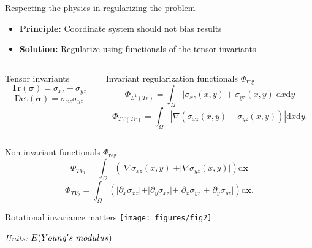 \documentclass[presentation,aspectratio=169]{beamer}
\newcommand{\dd}{\mathrm{d}}
\newcommand{\bx}{\mathbf{x}}
\begin{document}
 
\begin{frame}{Respecting the physics in regularizing the problem}
\small
\begin{itemize}
\item \textbf{Principle:} Coordinate system should not bias results
\item \textbf{Solution:}  Regularize using functionals of the tensor invariants
\end{itemize}
\begin{columns}
\begin{column}{0.35\textwidth}
\begin{block}{Tensor invariants}
\[
\textrm{Tr}(\boldsymbol\sigma) = \sigma_{xz} + \sigma_{yz}
\]
\[
\textrm{Det}(\boldsymbol\sigma) = \sigma_{xz}\sigma_{yz}
\]
\end{block}
\end{column}
\begin{column}{0.6\textwidth}
\begin{exampleblock}{Invariant regularization functionals $\Phi_{\textrm{reg}}$}
\[
\Phi_{L^1(Tr)} = \int_\Omega \vert \sigma_{xz}(x,y) + \sigma_{yz}(x,y)  \vert \dd x\dd y
\]
\[
\Phi_{TV(Tr)} =  \int_\Omega | \nabla(\sigma_{xz}(x,y) + \sigma_{yz}(x,y) ) | \dd x\dd y.
\]

\end{exampleblock}
\end{column}
\end{columns}
\begin{block}{Non-invariant functionals $\Phi_{\textrm{reg}}$}
\[
 \Phi_{TV_1} = \int_\Omega \left( \vert\nabla\sigma_{xz}(x,y) \vert + \vert\nabla\sigma_{yz}(x,y) \vert\right)\dd\bx
\]
\[
\Phi_{TV_2} = \int_\Omega  \left( \vert\partial_x\sigma_{xz}\vert + \vert\partial_y\sigma_{xz}\vert + \vert\partial_x\sigma_{yz}\vert+ \vert\partial_y\sigma_{yz}\vert\right)\dd\bx.
\]

\end{block}

\end{frame}

 
 
\begin{frame}{Rotational invariance matters}
\centering
\texttt{[image: figures/fig2]}

\smallskip
\emph{Units:} $E\textrm(Young's\ modulus)$
\end{frame}
\end{document}
